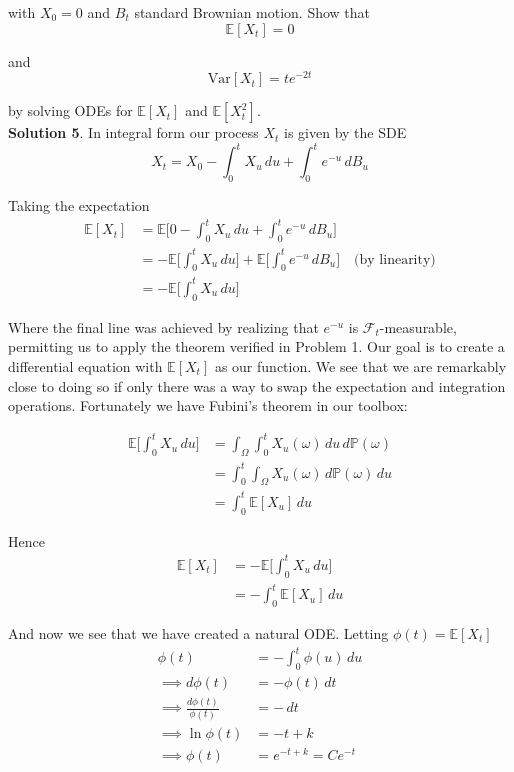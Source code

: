 \documentclass[12pt]{article}
\newlength\tindent
\renewcommand{\indent}{\hspace*{\tindent}}
\begin{document}
with $X_0 = 0$ and $B_t$ standard Brownian motion. Show that
\begin{equation*}
	\mathbb E[X_t] = 0
\end{equation*}

and 
\begin{equation*}
	\mathrm {Var}[X_t] = te^{-2t}
\end{equation*}

by solving ODEs for $\mathbb E[X_t]$ and $\mathbb E[X_t^2]$. \\

{\bf Solution 5}. In integral form our process $X_t$ is given by the SDE
\begin{equation*}
	X_t = X_0 - \int^t_0 X_u \,du + \int^t_0 e^{-u}\,dB_u
\end{equation*}

Taking the expectation 
\begin{align*}
	\mathbb E[X_t] &= \mathbb E\Big[0- \int^t_0 X_u \,du + \int^t_0 e^{-u}\,dB_u\Big] \\
	&= - \mathbb E\Big[\int^t_0 X_u \,du\Big] + \mathbb E\Big[\int^t_0 e^{-u}\,dB_u\Big] \quad \text{(by linearity)} \\
	&= - \mathbb E\Big[\int^t_0 X_u \,du\Big] 
\end{align*}

\indent Where the final line was achieved by realizing that $e^{-u}$ is $\mathcal F_t$-measurable, permitting us to apply the theorem verified in Problem 1. Our goal is to create a differential equation with $\mathbb E[X_t]$ as our function. We see that we are remarkably close to doing so if only there was a way to swap the expectation and integration operations. Fortunately we have Fubini's theorem in our toolbox:

\begin{align*}
	\mathbb E\Big[\int^t_0 X_u\,du \Big] &= \int_\Omega \int^t_0 X_u(\omega) \,du\,d\mathbb P(\omega) \\
	&= \int^t_0 \int_\Omega X_u(\omega) \,d\mathbb P(\omega)\,du \\
	&= \int^t_0 \mathbb E[X_u]\,du
\end{align*}

Hence
\begin{align*}
	\mathbb E[X_t] &= -\mathbb E\Big[\int^t_0 X_u \,du\Big] \\
	&= -\int^t_0 \mathbb E[X_u]\,du
\end{align*}

And now we see that we have created a natural ODE. Letting $\phi(t) = \mathbb E[X_t]$
\begin{align*}
	\phi(t) &= -\int^t_0 \phi(u)\,du \\
	\implies d\phi(t) &= -\phi(t)\,dt \\
	\implies \frac{d\phi(t)}{\phi(t)} &= -\,dt \\
	\implies \ln \phi(t) &= -t + k \\
	\implies \phi(t) &= e^{-t + k} = Ce^{-t}
\end{align*}
\end{document}
